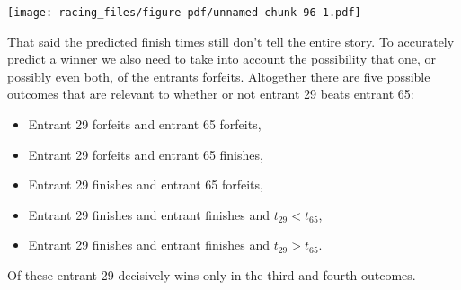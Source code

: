 \documentclass[
  letterpaper,
  DIV=11,
  numbers=noendperiod]{scrartcl}
\newenvironment{Shaded}{\begin{snugshade}}{\end{snugshade}}
\newcommand{\AttributeTok}[1]{\textcolor[rgb]{0.40,0.45,0.13}{#1}}
\newcommand{\ConstantTok}[1]{\textcolor[rgb]{0.56,0.35,0.01}{#1}}
\newcommand{\DecValTok}[1]{\textcolor[rgb]{0.68,0.00,0.00}{#1}}
\newcommand{\FloatTok}[1]{\textcolor[rgb]{0.68,0.00,0.00}{#1}}
\newcommand{\FunctionTok}[1]{\textcolor[rgb]{0.28,0.35,0.67}{#1}}
\newcommand{\NormalTok}[1]{\textcolor[rgb]{0.00,0.23,0.31}{#1}}
\newcommand{\SpecialCharTok}[1]{\textcolor[rgb]{0.37,0.37,0.37}{#1}}
\newcommand{\StringTok}[1]{\textcolor[rgb]{0.13,0.47,0.30}{#1}}
\providecommand{\tightlist}{%
  \setlength{\itemsep}{0pt}\setlength{\parskip}{0pt}}\usepackage{longtable,booktabs,array}
\begin{document}
\begin{Shaded}
\end{Shaded}

\texttt{[image: racing\_files/figure-pdf/unnamed-chunk-96-1.pdf]}

That said the predicted finish times still don't tell the entire story.
To accurately predict a winner we also need to take into account the
possibility that one, or possibly even both, of the entrants forfeits.
Altogether there are five possible outcomes that are relevant to whether
or not entrant 29 beats entrant 65:

\begin{itemize}
\tightlist
\item
  Entrant 29 forfeits and entrant 65 forfeits,
\item
  Entrant 29 forfeits and entrant 65 finishes,
\item
  Entrant 29 finishes and entrant 65 forfeits,
\item
  Entrant 29 finishes and entrant finishes and \(t_{29} < t_{65}\),
\item
  Entrant 29 finishes and entrant finishes and \(t_{29} > t_{65}\).
\end{itemize}

Of these entrant 29 decisively wins only in the third and fourth
outcomes.
\end{document}
